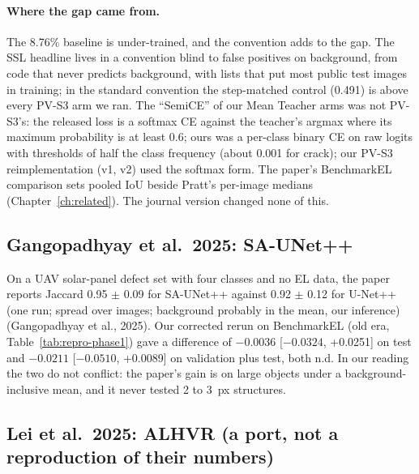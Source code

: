 \paragraph{Where the gap came from.} The 8.76\% baseline is under-trained, and the convention adds to the gap. The SSL headline lives in
a convention blind to false positives on background, from code that never predicts background, with lists that put most public test
images in training; in the standard convention the step-matched control (0.491) is above every PV-S3 arm we ran. The ``SemiCE'' of our Mean Teacher
arms was not PV-S3's: the released loss is a softmax CE against the teacher's argmax where its maximum probability is at least 0.6; ours was a
per-class binary CE on raw logits with thresholds of half the class frequency (about 0.001 for crack); our PV-S3 reimplementation (v1, v2) used the softmax form. The paper's BenchmarkEL
comparison sets pooled IoU beside Pratt's per-image medians (Chapter~\ref{ch:related}). The journal version changed none of this.

\subsection{Gangopadhyay et al.\ 2025: SA-UNet++}\label{sec:repro-saunet}

On a UAV solar-panel defect set with four classes and no EL data, the paper reports Jaccard 0.95 $\pm$ 0.09 for SA-UNet++ against
0.92 $\pm$ 0.12 for U-Net++ (one run; spread over images; background probably in the mean, our inference)
(Gangopadhyay et al., 2025). Our corrected rerun on BenchmarkEL (old era, Table~\ref{tab:repro-phase1}) gave a
difference of $-0.0036$ [$-0.0324$, +0.0251] on test and $-0.0211$ [$-0.0510$, +0.0089] on validation plus test, both n.d. In our
reading the two do not conflict: the paper's gain is on large objects under a background-inclusive mean, and it never tested 2 to 3~px
structures.

\subsection{Lei et al.\ 2025: ALHVR (a port, not a reproduction of their numbers)}\label{sec:repro-alhvr}

